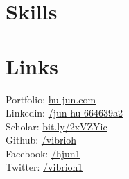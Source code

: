 \documentclass[]{junhu_resume}
\begin{document}
\begin{minipage}[t]{0.28\textwidth}
\section{Skills}
{}
\location{Graph Database \textbullet{} SQL \textbullet{} Hive
}
\sectionsep



\section{Links} 
Portfolio: \href{http://www.hu-jun.com}{hu-jun.com}\\
Linkedin: \href{https://www.linkedin.com/in/jun-hu-664639a2/}{/jun-hu-664639a2} \\
Scholar: \href{https://scholar.google.com/citations?user=Vr8dYJsAAAAJ&hl=en}{bit.ly/2xVZYic}\\
Github: \href{https://github.com/vibrioh}{/vibrioh}\\
Facebook: \href{https://www.facebook.com/hjun1}{/hjun1}\\
Twitter: \href{https://twitter.com/vibrioh1}{/vibrioh1}\\
\sectionsep

%
%

\end{minipage} 
\end{document}
